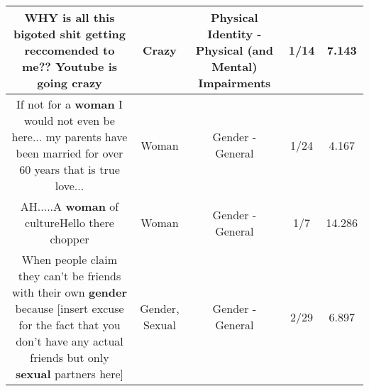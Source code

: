 \documentclass[11pt]{article}
\newlength\mylength
\begin{document}
\begin{center}
\begin{longtable}{|C{.65\mylength}|C{.30\mylength}|C{.12\mylength}|C{.12\mylength}|C{.12\mylength}|}
  \small WHY is all this bigoted shit getting reccomended to me?? Youtube is going crazy\normalsize   & Crazy & Physical Identity - Physical (and Mental) Impairments & 1/14 & 7.143 \\  \hline
  \small If not for a \textbf{woman} I would not even  be here... my parents have been married for over 60 years that is true love...\normalsize   & Woman & Gender - General & 1/24 & 4.167 \\  \hline
  \small AH.....A \textbf{woman} of cultureHello there chopper\normalsize   & Woman & Gender - General & 1/7 & 14.286 \\  \hline
  \small When people claim they can't be friends with their own \textbf{gender} because [insert excuse  for the fact that you don't have any actual friends but only \textbf{sexual} partners here]\normalsize   & Gender, Sexual & Gender - General & 2/29 & 6.897 \\  \hline

\end{longtable}
\end{center}
\end{document}
